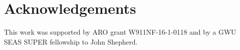 \documentclass[conference]{IEEEtran}
\begin{document}


\section*{Acknowledgements}
This work was supported by ARO grant W911NF-16-1-0118 and by a GWU SEAS SUPER fellowship to John Shepherd.



\end{document}
